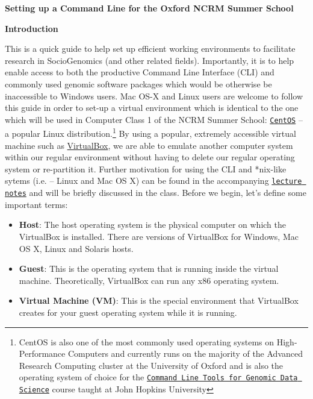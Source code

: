 \documentclass[10pt]{article}
\begin{document}
\begin{center}
\textbf{\large{\textbf{Setting up a Command Line for the Oxford NCRM Summer School}}}\\
\end{center}
\vspace{0.2in}

\textbf{Introduction}

This is a quick guide to help set up efficient working environments to facilitate research in SocioGenomics (and other related fields). Importantly, it is to help enable access to both the productive Command Line Interface (CLI) and commonly used genomic software packages which would be otherwise be inaccessible to Windows users. Mac OS-X and Linux users are welcome to follow this guide in order to set-up a virtual environment which is identical to the one which will be used in Computer Class 1 of the NCRM Summer School: \href{https://www.centos.org/}{\texttt{CentOS}} -- a popular Linux distribution.\footnote{CentOS is also one of the most commonly used operating systems on High-Performance Computers and currently runs on the majority of the  Advanced Research Computing cluster at the University of Oxford and is also the operating system of choice for the \href{https://www.coursera.org/learn/genomic-tools}{\texttt{Command Line Tools for Genomic Data Science}} course taught at John Hopkins University} By using a popular, extremely accessible virtual machine such as \href{}{VirtualBox}, we are able to emulate another computer system within our regular environment without having to delete our regular operating system or re-partition it. Further motivation for using the CLI and *nix-like sytems (i.e. -- Linux and Mac OS X) can be found in the accompanying \href{https://github.com/crahal/Teaching/tree/master/AnIntroductionToTheCommandLine}{\texttt{lecture notes}} and will be briefly discussed in the class. Before we begin, let's define some important terms:
\begin{itemize}
\item \textbf{Host}: The host operating system is the physical computer on which the VirtualBox is installed. There are versions of VirtualBox for Windows, Mac OS X, Linux and Solaris hosts.
\item \textbf{Guest}: This is the operating system that is running inside the virtual machine. Theoretically, VirtualBox can run any x86 operating system.
\item \textbf{Virtual Machine (VM)}: This is the special environment that VirtualBox creates for your guest operating system while it is running. 
\end{itemize}
\vspace{0.2in}
\end{document}
